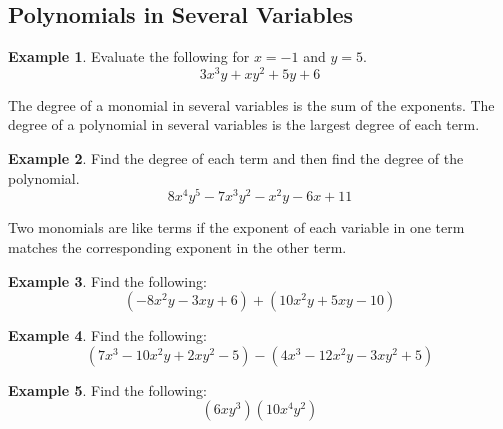 \documentclass[addpoints,12pt]{exam}
\theoremstyle{definition}
\theoremstyle{break}
\theoremstyle{break}
\newtheorem{example}{Example}[subsection]
\begin{document}
\setcounter{section}{5}
\setcounter{subsection}{3}

\subsection{Polynomials in Several Variables}

\vspace{.15in}

\begin{example}
Evaluate the following for $x = -1$ and $y = 5$.
\[3x^3y + xy^2 + 5y + 6\]
\vspace{.75in}
\end{example}

\begin{definition}[Degree]
The degree of a monomial in several variables is the sum of the exponents. The degree of a polynomial in several variables is the largest degree of each term.
\end{definition}

\vspace{.15in}

\begin{example}
Find the degree of each term and then find the degree of the polynomial.
\[8x^4y^5 - 7x^3y^2 - x^2y - 6x + 11\]
\vspace{1in}
\end{example}

\begin{definition}
Two monomials are like terms if the exponent of each variable in one term matches the corresponding exponent in the other term.
\end{definition}

\newpage

\begin{example}
Find the following:
\[ (-8x^2y - 3xy+6) + (10x^2y + 5xy - 10)\]
\vspace{1in}
\end{example}

\begin{example}
Find the following:
\[ (7x^3 - 10x^2y + 2xy^2 - 5) - (4x^3 - 12x^2y - 3xy^2 + 5)\]
\vspace{1in}
\end{example}

\begin{example}
Find the following:
\[ (6xy^3)(10x^4y^2)\]
\vspace{1in}
\end{example}
\end{document}
